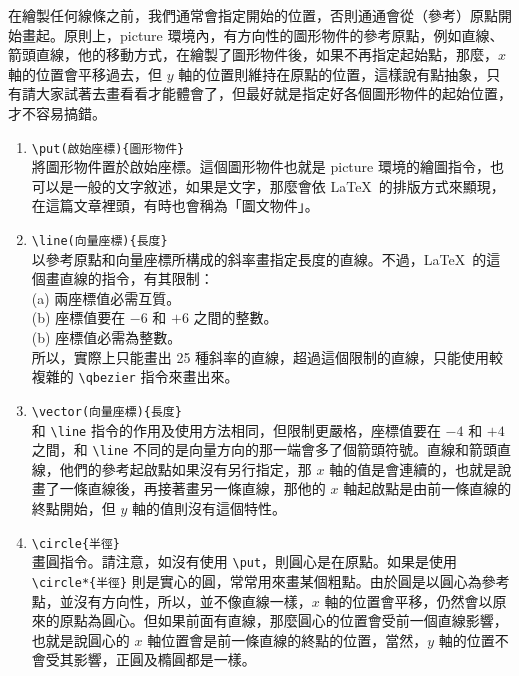 在繪製任何線條之前，我們通常會指定開始的位置，否則通通會從（參考）原點開始畫起。原則上，{\ttfamily picture} 環境內，有方向性的圖形物件的參考原點，例如直線、箭頭直線，他的移動方式，在繪製了圖形物件後，如果不再指定起始點，那麼，$x$ 軸的位置會平移過去，但 $y$ 軸的位置則維持在原點的位置，這樣說有點抽象，只有請大家試著去畫看看才能體會了，但最好就是指定好各個圖形物件的起始位置，才不容易搞錯。

\begin{enumerate}

  \item \verb|\put(啟始座標){圖形物件}| \\
        將圖形物件置於啟始座標。這個圖形物件也就是 {\ttfamily picture} 環境的繪圖指令，也可以是一般的文字敘述，如果是文字，那麼會依 \LaTeX\ 的排版方式來顯現，在這篇文章裡頭，有時也會稱為「圖文物件」。

  \item \verb|\line(向量座標){長度}| \\
        以參考原點和向量座標所構成的斜率畫指定長度的直線。不過，\LaTeX\ 的這個畫直線的指令，有其限制：\\
        \hspace*{1em}(a) 兩座標值必需互質。\\
        \hspace*{1em}(b) 座標值要在 $-6$ 和 $+6$ 之間的整數。\\
        \hspace*{1em}(b) 座標值必需為整數。\\
        所以，實際上只能畫出 25 種斜率的直線，超過這個限制的直線，只能使用較複雜的 \verb|\qbezier| 指令來畫出來。

  \item \verb|\vector(向量座標){長度}|\\
        和 \verb|\line| 指令的作用及使用方法相同，但限制更嚴格，座標值要在 $-4$ 和 $+4$ 之間，和 \verb|\line| 不同的是向量方向的那一端會多了個箭頭符號。直線和箭頭直線，他們的參考起啟點如果沒有另行指定，那 $x$ 軸的值是會連續的，也就是說畫了一條直線後，再接著畫另一條直線，那他的 $x$ 軸起啟點是由前一條直線的終點開始，但 $y$ 軸的值則沒有這個特性。

  \item \verb|\circle{半徑}|\\
        畫圓指令。請注意，如沒有使用 \verb|\put|，則圓心是在原點。如果是使用 \verb|\circle*{半徑}| 則是實心的圓，常常用來畫某個粗點。由於圓是以圓心為參考點，並沒有方向性，所以，並不像直線一樣，$x$ 軸的位置會平移，仍然會以原來的原點為圓心。但如果前面有直線，那麼圓心的位置會受前一個直線影響，也就是說圓心的 $x$ 軸位置會是前一條直線的終點的位置，當然，$y$ 軸的位置不會受其影響，正圓及橢圓都是一樣。


\end{enumerate}
